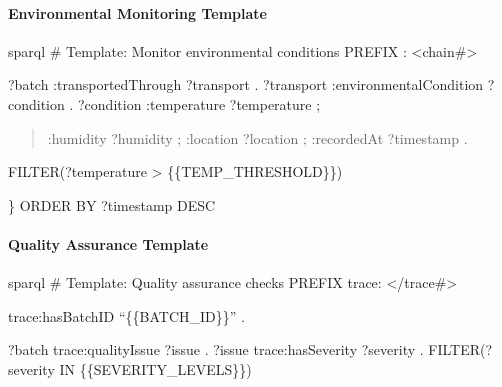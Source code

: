 \documentclass[letterpaper,10pt,english]{sphinxmanual}
\begin{document}
\paragraph{Environmental Monitoring Template}
\label{\detokenize{api/sparql-api:environmental-monitoring-template}}
\sphinxAtStartPar
{\color{red}\bfseries{}\textasciigrave{}\textasciigrave{}}{\color{red}\bfseries{}\textasciigrave{}}sparql
\# Template: Monitor environmental conditions
PREFIX : \textless{}\sphinxhyphen{}chain\#\textgreater{}
\begin{description}
\sphinxAtStartPar
?batch :transportedThrough ?transport .
?transport :environmentalCondition ?condition .
?condition :temperature ?temperature ;
\begin{quote}

\sphinxAtStartPar
:humidity ?humidity ;
:location ?location ;
:recordedAt ?timestamp .
\end{quote}

\sphinxAtStartPar
FILTER(?temperature \textgreater{} \{\{TEMP\_THRESHOLD\}\})

\end{description}

\sphinxAtStartPar
\}
ORDER BY ?timestamp DESC
{\color{red}\bfseries{}\textasciigrave{}\textasciigrave{}}{\color{red}\bfseries{}\textasciigrave{}}


\paragraph{Quality Assurance Template}
\label{\detokenize{api/sparql-api:quality-assurance-template}}
\sphinxAtStartPar
{\color{red}\bfseries{}\textasciigrave{}\textasciigrave{}}{\color{red}\bfseries{}\textasciigrave{}}sparql
\# Template: Quality assurance checks
PREFIX trace: \textless{}/trace\#\textgreater{}
\begin{description}
\begin{description}
\sphinxAtStartPar
trace:hasBatchID “\{\{BATCH\_ID\}\}” .

\end{description}

\sphinxAtStartPar
?batch trace:qualityIssue ?issue .
?issue trace:hasSeverity ?severity .
FILTER(?severity IN \{\{SEVERITY\_LEVELS\}\})

\end{description}
\end{document}
